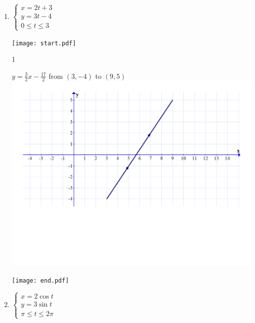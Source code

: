 \documentclass[12pt]{article}
\begin{document}
\begin{enumerate}

\item $\left\{\begin{array}{l}
x=2t+3\\
y=3t-4\\
0\leq t \leq 3 \end{array}\right.$

\texttt{[image: start.pdf]}
{{{1\linewidth}{\begin{center}
$y=\frac{3}{2}x-\frac{17}{2}$ from $(3,-4)$ to $(9,5)$\\
\medskip
\includegraphics[scale=0.3]{ans1.pdf}
\end{center}}}}
\texttt{[image: end.pdf]}


\item $\left\{\begin{array}{l}
x=2\cos{t}\\
y=3\sin{t}\\
\pi \leq t \leq 2\pi \end{array}\right.$ 


\end{enumerate}
\end{document}
